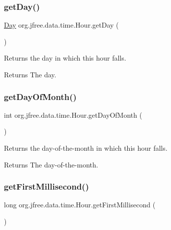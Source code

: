\subsubsection{\texorpdfstring{get\+Day()}{getDay()}}
{\footnotesize\ttfamily \mbox{\hyperlink{classorg_1_1jfree_1_1data_1_1time_1_1_day}{Day}} org.\+jfree.\+data.\+time.\+Hour.\+get\+Day (\begin{DoxyParamCaption}{ }\end{DoxyParamCaption})}

Returns the day in which this hour falls.

\begin{DoxyReturn}{Returns}
The day. 
\end{DoxyReturn}
\mbox{\label{classorg_1_1jfree_1_1data_1_1time_1_1_hour_a7b2485bf87de65dc09e281fbfc534c37}} 
\subsubsection{\texorpdfstring{get\+Day\+Of\+Month()}{getDayOfMonth()}}
{\footnotesize\ttfamily int org.\+jfree.\+data.\+time.\+Hour.\+get\+Day\+Of\+Month (\begin{DoxyParamCaption}{ }\end{DoxyParamCaption})}

Returns the day-\/of-\/the-\/month in which this hour falls.

\begin{DoxyReturn}{Returns}
The day-\/of-\/the-\/month. 
\end{DoxyReturn}
\mbox{\label{classorg_1_1jfree_1_1data_1_1time_1_1_hour_a180071a5f4e36222323074f091ed733f}} 
\subsubsection{\texorpdfstring{get\+First\+Millisecond()}{getFirstMillisecond()}\hspace{0.1cm}{\footnotesize\ttfamily [1/2]}}
{\footnotesize\ttfamily long org.\+jfree.\+data.\+time.\+Hour.\+get\+First\+Millisecond (\begin{DoxyParamCaption}{ }\end{DoxyParamCaption})}

